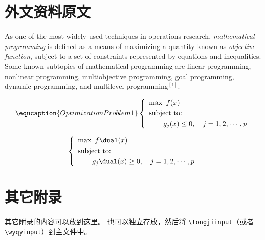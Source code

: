 
\chapter{外文资料原文}
\label{chap:appx:1}
As one of the most widely used techniques in operations research, {\em mathematical programming} is defined as a means of maximizing a quantity known as {\em objective function}, subject to a set of constraints represented by equations and inequalities.
Some known subtopics of mathematical programming are linear programming, nonlinear programming, multiobjective programming, goal programming, dynamic programming, and multilevel programming$^{[1]}$.


\begin{equation} \equcaption{Optimization Problem 1} %
    \left\{ \begin{array}{l}
        \max \,\,f(x)      \\ [0.1 cm]
        \mbox{subject to:} \\ [0.1 cm]
        \qquad g_j(x)\le 0, \quad j=1,2,\cdots,p
    \end{array} \right.
\end{equation}

\begin{equation}
    \left\{ \begin{array}{l}
        \max \,\,f\dual(x) \\ [0.1 cm]
        \mbox{subject to:} \\ [0.1 cm]
        \qquad g_j\dual(x)\ge 0, \quad j=1,2,\cdots,p
    \end{array} \right.
\end{equation}

\chapter{其它附录}
\label{chap:appx:2}
其它附录的内容可以放到这里。
也可以独立存放，然后将 \verb|\tongjiinput|（或者 \verb|\wyqyinput|）到主文件中。
